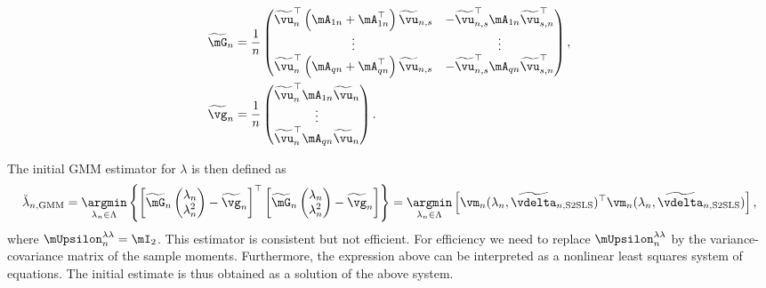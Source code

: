 \documentclass[english,12pt]{book}\usepackage[]{graphicx}\usepackage[]{xcolor}
\begin{document}
\begin{equation*}
\begin{aligned}
\widetilde{\mG}_n & = \frac{1}{n}
                    \begin{pmatrix}
                      \widetilde{\vu}^\top_n\left(\mA_{1n} + \mA^\top_{1n}\right)\widetilde{\vu}_{n,s} & - \widetilde{\vu}^\top_{n,s}\mA_{1n}\widetilde{\vu}^\top_{s,n} \\
                      \vdots & \vdots \\
                      \widetilde{\vu}^\top_n\left(\mA_{qn} + \mA^\top_{qn}\right)\widetilde{\vu}_{n,s} & - \widetilde{\vu}^\top_{n,s}\mA_{qn}\widetilde{\vu}^\top_{s,n}
                    \end{pmatrix}, \\
\widetilde{\vg}_n & = \frac{1}{n}\begin{pmatrix}
                                \widetilde{\vu}^\top_n\mA_{1n}\widetilde{\vu}_n \\
                                \vdots \\
                                \widetilde{\vu}^\top_n\mA_{qn}\widetilde{\vu}_n
                                \end{pmatrix}.
\end{aligned}
\end{equation*}


The initial GMM estimator for $\lambda$ is then defined as
\begin{equation*}
\breve{\lambda}_{n, \textrm{GMM}} = \underset{\lambda_n \in \Lambda}{\argmin}\left\lbrace \left[\widetilde{\mG}_n\begin{pmatrix} \lambda_n \\
                \lambda^2_n
\end{pmatrix} - \widetilde{\vg}_n \right]^\top \left[\widetilde{\mG}_n\begin{pmatrix} \lambda_n \\
                \lambda^2_n
\end{pmatrix} - \widetilde{\vg}_n\right]\right\rbrace = \underset{\lambda_n\in \Lambda}{\argmin}\left[\vm_n(\lambda_n,\widetilde{\vdelta}_{n, \textrm{S2SLS}})^\top \vm_n(\lambda_n,\widetilde{\vdelta}_{n, \textrm{S2SLS}})\right],
\end{equation*}
%
where $\mUpsilon^{\lambda\lambda}_n = \mI_2$. This estimator is consistent but not efficient. For efficiency we need to replace $\mUpsilon^{\lambda\lambda}_n$ by the variance-covariance matrix of the sample moments. Furthermore, the expression above can be interpreted as a nonlinear least squares system of equations. The initial estimate is thus obtained as a solution of the above system. 
\end{document}
